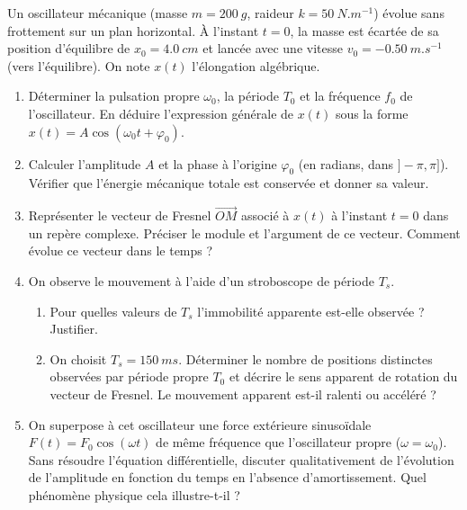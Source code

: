 \documentclass[11pt]{article}
\begin{document}
\begin{exercice}
Un oscillateur mécanique (masse $m = \SI{200}{g}$, raideur $k = \SI{50}{N.m^{-1}}$) évolue sans frottement sur un plan horizontal. À l'instant $t=0$, la masse est écartée de sa position d'équilibre de $x_0 = \SI{4,0}{cm}$ et lancée avec une vitesse $v_0 = -\SI{0,50}{m.s^{-1}}$ (vers l'équilibre). On note $x(t)$ l'élongation algébrique.
\begin{enumerate}
    \item Déterminer la pulsation propre $\omega_0$, la période $T_0$ et la fréquence $f_0$ de l'oscillateur. En déduire l'expression générale de $x(t)$ sous la forme $x(t) = A \cos(\omega_0 t + \varphi_0)$.
    \item Calculer l'amplitude $A$ et la phase à l'origine $\varphi_0$ (en radians, dans $]-\pi, \pi]$). Vérifier que l'énergie mécanique totale est conservée et donner sa valeur.
    \item Représenter le vecteur de Fresnel $\overrightarrow{OM}$ associé à $x(t)$ à l'instant $t=0$ dans un repère complexe. Préciser le module et l'argument de ce vecteur. Comment évolue ce vecteur dans le temps ?
    \item On observe le mouvement à l'aide d'un stroboscope de période $T_s$. 
    \begin{enumerate}
        \item Pour quelles valeurs de $T_s$ l'immobilité apparente est-elle observée ? Justifier.
        \item On choisit $T_s = \SI{150}{ms}$. Déterminer le nombre de positions distinctes observées par période propre $T_0$ et décrire le sens apparent de rotation du vecteur de Fresnel. Le mouvement apparent est-il ralenti ou accéléré ?
    \end{enumerate}
    \item On superpose à cet oscillateur une force extérieure sinusoïdale $F(t) = F_0 \cos(\omega t)$ de même fréquence que l'oscillateur propre ($\omega = \omega_0$). Sans résoudre l'équation différentielle, discuter qualitativement de l'évolution de l'amplitude en fonction du temps en l'absence d'amortissement. Quel phénomène physique cela illustre-t-il ?
\end{enumerate}
\end{exercice}
\end{document}
